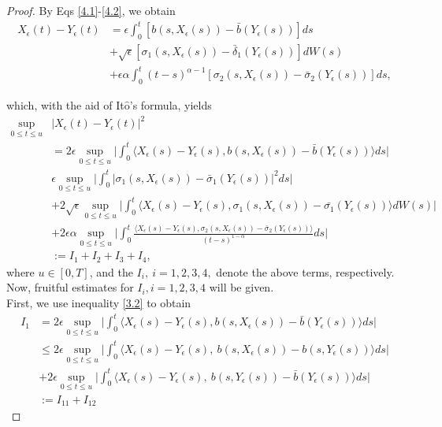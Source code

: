 \documentclass[a4 paper, 12pt]{report}
\theoremstyle{plain}
\begin{document}
\begin{proof}
By Eqs \eqref{4.1}-\eqref{4.2}, we obtain
\begin{align*}
X_\epsilon(t) - Y_\epsilon(t)& = \epsilon\int_0^t[b(s,X_\epsilon(s)) - \bar{b}(Y_\epsilon(s))]ds\\
&+\sqrt{\epsilon}[\sigma_1(s,X_\epsilon(s)) - \bar{\delta}_1(Y_\epsilon(s))]dW(s)\\
&+\epsilon\alpha\int_0^t(t-s)^{\alpha -1}[\sigma_2(s,X_\epsilon(s)) - \bar{\sigma}_2(Y_\epsilon(s))]ds,
\end{align*}

which, with the aid of It$\hat{\mbox{o}}$'s formula, yields
\begin{align*}
\sup_{0\leq t\leq u}&|X_\epsilon(t) - Y_\epsilon(t)|^2\\
& = 2\epsilon\sup_{0\leq t\leq u}\bigg|\int_0^t\langle X_\epsilon(s) - Y_\epsilon(s),b(s,X_\epsilon(s)) - \bar{b}(Y_\epsilon(s))\rangle ds\bigg|\\
&\epsilon\sup_{0\leq t\leq u}\bigg|\int_0^t|\sigma_1(s,X_\epsilon(s)) - \bar{\sigma}_1(Y_\epsilon(s))|^2ds\bigg|\\
&+2\sqrt{\epsilon}\sup_{0\leq t\leq u}\bigg|\int_0^t\langle X_\epsilon(s) - Y_\epsilon(s),\sigma_1(s,X_\epsilon(s)) - \bar{\sigma_1}(Y_\epsilon(s))\rangle dW(s)\bigg|\\
&+2\epsilon\alpha\sup_{0\leq t\leq u}\bigg|\int_0^t\frac{\langle X_\epsilon(s) - Y_\epsilon(s),\sigma_2(s,X_\epsilon(s)) - \bar{\sigma}_2(Y_\epsilon(s))\rangle}{(t-s)^{1-\alpha}}ds\bigg|\\
&:=I_1+I_2+I_3+I_4,
\end{align*}
where $u \in [0, T]$, and the $I_i, ~ i = 1, 2, 3, 4,$ denote the above terms, respectively.\\
Now, fruitful estimates for $I_i, i = 1, 2, 3, 4$ will be given.\\
First, we use inequality \eqref{3.2} to obtain
\begin{align*}
I_1& = 2\epsilon\sup_{0\leq t\leq u}\bigg|\int_0^t\langle X_\epsilon(s) - Y_\epsilon(s),b(s,X_\epsilon(s)) - \bar{b}(Y_\epsilon(s))\rangle ds\bigg|\\
&\leq 2\epsilon\sup_{0\leq t\leq u}\bigg|\int_0^t\langle X_\epsilon(s) - Y_\epsilon(s),~b(s,X_\epsilon(s)) - b(s,Y_\epsilon(s))\rangle ds\bigg|\\
&+ 2\epsilon\sup_{0\leq t\leq u}\bigg|\int_0^t\langle X_\epsilon(s) - Y_\epsilon(s),~b(s,Y_\epsilon(s)) - \bar{b}(Y_\epsilon(s))\rangle ds\bigg|\\
&:=I_{11}+I_{12}

\end{align*}
\end{proof}
\end{document}

